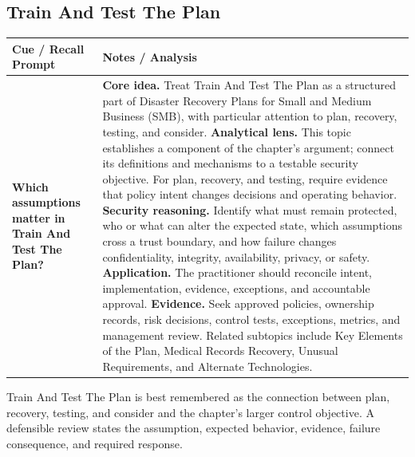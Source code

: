 \documentclass[11pt]{article}
\newcommand{\CornellHeader}{%
\rowcolor{Navy}\color{white}\bfseries Cue / Recall Prompt & \color{white}\bfseries Notes / Analysis\\\hline}
\newcommand{\CornellRow}[2]{%
\cellcolor{CueGray}\RaggedRight\textbf{#1} & \RaggedRight #2\\\hline}
\begin{document}
\subsection*{Train And Test The Plan}
\begin{longtable}{>{\RaggedRight\arraybackslash}p{}|>{\RaggedRight\arraybackslash}p{}}
\CornellHeader
\CornellRow{Which assumptions matter in Train And Test The Plan?}{\textbf{Core idea.} Treat Train And Test The Plan as a structured part of Disaster Recovery Plans for Small and Medium Business (SMB), with particular attention to plan, recovery, testing, and consider. \textbf{Analytical lens.} This topic establishes a component of the chapter's argument; connect its definitions and mechanisms to a testable security objective. For plan, recovery, and testing, require evidence that policy intent changes decisions and operating behavior. \textbf{Security reasoning.} Identify what must remain protected, who or what can alter the expected state, which assumptions cross a trust boundary, and how failure changes confidentiality, integrity, availability, privacy, or safety. \textbf{Application.} The practitioner should reconcile intent, implementation, evidence, exceptions, and accountable approval. \textbf{Evidence.} Seek approved policies, ownership records, risk decisions, control tests, exceptions, metrics, and management review. Related subtopics include Key Elements of the Plan, Medical Records Recovery, Unusual Requirements, and Alternate Technologies.}
\end{longtable}
\begin{topicsummary}
Train And Test The Plan is best remembered as the connection between plan, recovery, testing, and consider and the chapter's larger control objective. A defensible review states the assumption, expected behavior, evidence, failure consequence, and required response.
\end{topicsummary}
\end{document}
